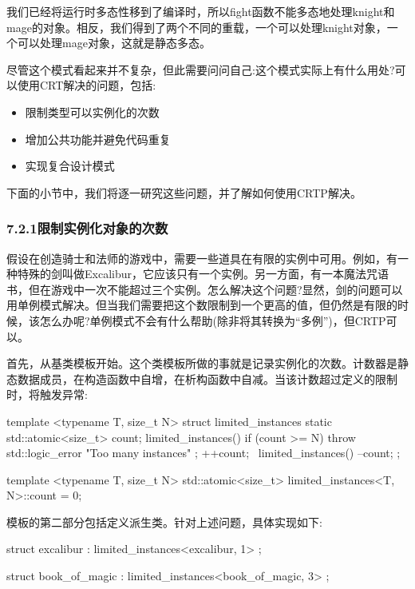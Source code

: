 我们已经将运行时多态性移到了编译时，所以fight函数不能多态地处理knight和mage的对象。相反，我们得到了两个不同的重载，一个可以处理knight对象，一个可以处理mage对象，这就是静态多态。

尽管这个模式看起来并不复杂，但此需要问问自己:这个模式实际上有什么用处?可以使用CRT解决的问题，包括:

\begin{itemize}
\item
限制类型可以实例化的次数

\item
增加公共功能并避免代码重复

\item
实现复合设计模式
\end{itemize}

下面的小节中，我们将逐一研究这些问题，并了解如何使用CRTP解决。

\subsubsection{7.2.1\hspace{0.2cm}限制实例化对象的次数}

假设在创造骑士和法师的游戏中，需要一些道具在有限的实例中可用。例如，有一种特殊的剑叫做Excalibur，它应该只有一个实例。另一方面，有一本魔法咒语书，但在游戏中一次不能超过三个实例。怎么解决这个问题?显然，剑的问题可以用单例模式解决。但当我们需要把这个数限制到一个更高的值，但仍然是有限的时候，该怎么办呢?单例模式不会有什么帮助(除非将其转换为“多例”)，但CRTP可以。

首先，从基类模板开始。这个类模板所做的事就是记录实例化的次数。计数器是静态数据成员，在构造函数中自增，在析构函数中自减。当该计数超过定义的限制时，将触发异常:

\begin{cpp}
template <typename T, size_t N>
struct limited_instances
{
	static std::atomic<size_t> count;
	limited_instances()
	{
		if (count >= N)
			throw std::logic_error{ "Too many instances" };
		++count;
	}
	~limited_instances() { --count; }
};

template <typename T, size_t N>
std::atomic<size_t> limited_instances<T, N>::count = 0;
\end{cpp}

模板的第二部分包括定义派生类。针对上述问题，具体实现如下:

\begin{cpp}
struct excalibur : limited_instances<excalibur, 1>
{};

struct book_of_magic : limited_instances<book_of_magic, 3>
{};
\end{cpp}

